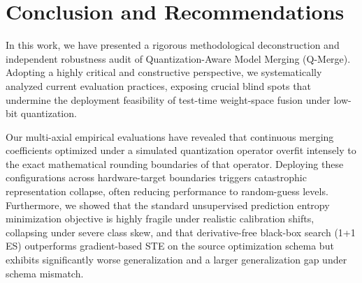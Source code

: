 \section{Conclusion and Recommendations}
\label{submission:sec:conclusion}

In this work, we have presented a rigorous methodological deconstruction and independent robustness audit of Quantization-Aware Model Merging (Q-Merge). Adopting a highly critical and constructive perspective, we systematically analyzed current evaluation practices, exposing crucial blind spots that undermine the deployment feasibility of test-time weight-space fusion under low-bit quantization. 

Our multi-axial empirical evaluations have revealed that continuous merging coefficients optimized under a simulated quantization operator overfit intensely to the exact mathematical rounding boundaries of that operator. Deploying these configurations across hardware-target boundaries triggers catastrophic representation collapse, often reducing performance to random-guess levels. Furthermore, we showed that the standard unsupervised prediction entropy minimization objective is highly fragile under realistic calibration shifts, collapsing under severe class skew, and that derivative-free black-box search (1+1 ES) outperforms gradient-based STE on the source optimization schema but exhibits significantly worse generalization and a larger generalization gap under schema mismatch.

